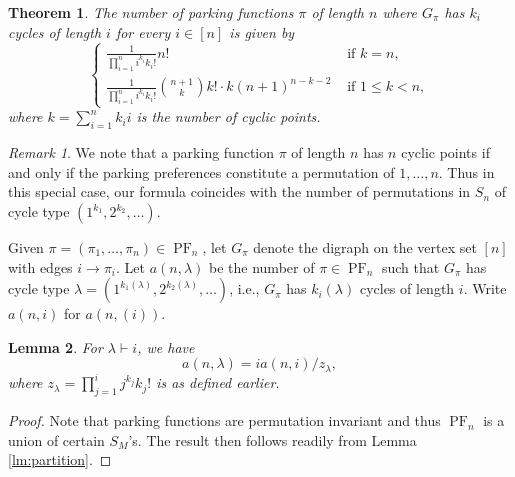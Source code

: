 \documentclass[letterpaper]{amsart}
\theoremstyle{plain}
\newtheorem{theorem}{Theorem}
\newtheorem{lemma}[theorem]{Lemma}
\theoremstyle{definition}
\theoremstyle{remark}
\newtheorem*{remark}{Remark}
\DeclareMathOperator{\PF}{PF}
\begin{document}
\begin{theorem}\label{main-cycle-count}
The number of parking functions $\pi$ of length $n$ where $G_\pi$ has $k_i$ cycles of length $i$ for every $i \in [n]$ is given by
\begin{equation*}
\begin{cases}
\frac{1}{\prod_{i=1}^n i^{k_i} k_i!} n! & \text{ if } k = n, \\
\frac{1}{\prod_{i=1}^n i^{k_i} k_i!}\binom{n+1}{k} k! \cdot k(n+1)^{n-k-2} & \text{ if } 1 \leq k < n,
\end{cases}
\end{equation*}
where $k=\sum_{i=1}^n k_i i$ is the number of cyclic points.
\end{theorem}

\begin{remark}
We note that a parking function $\pi$ of length $n$ has $n$ cyclic points if and only if the parking preferences constitute a permutation of $1, \dots, n$. Thus in this special case, our formula coincides with the number of permutations in $S_n$ of cycle type $(1^{k_1}, 2^{k_2}, \dots)$.
\end{remark}

Given $\pi=(\pi_1, \dots, \pi_n) \in \PF_n$, let $G_\pi$ denote the digraph on the vertex set $[n]$ with edges $i \rightarrow \pi_i$. Let $a(n,\lambda)$ be the number of $\pi\in \PF_n$ such that $G_\pi$ has cycle type 
$\lambda=(1^{k_1(\lambda)}, 2^{k_2(\lambda)}, \dots)$, i.e., $G_\pi$ has $k_i(\lambda)$ cycles of length $i$. Write $a(n,i)$ for $a(n,(i))$.

\begin{lemma}\label{lem:a(n,lambda)-and-a(n,i)}
For $\lambda\vdash i$, we have
\begin{equation*}\label{eq:identity}
a(n,\lambda) = i a(n,i)/z_\lambda,
\end{equation*}
where $z_\lambda=\prod_{j=1}^i j^{k_j} k_j!$ is as defined earlier.
\end{lemma}

\begin{proof}
Note that parking functions are permutation invariant and thus $\PF_n$ is a union of certain $S_M$'s. The result then follows readily from Lemma \ref{lm:partition}.
\end{proof}
\end{document}
